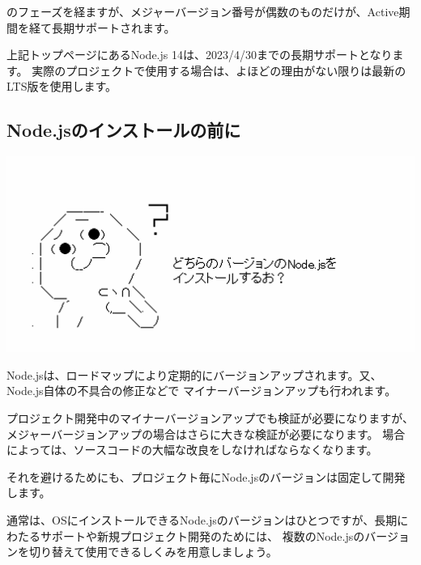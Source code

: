のフェーズを経ますが、メジャーバージョン番号が偶数のものだけが、Active期間を経て長期サポートされます。

\vspace*{\baselineskip}

上記トップページにあるNode.js 14は、2023/4/30までの長期サポートとなります。
実際のプロジェクトで使用する場合は、よほどの理由がない限りは最新のLTS版を使用します。

\subsection{Node.jsのインストールの前に}
\keeplastskip{
  \label{sec:1-1-2}
  \par\nobreak
}
\begin{reviewimage}%
\includegraphics[width=1.0\maxwidth]{./images/01-createDevEnv/y01_whichNodeVer.png}%
\label{image:01-createDevEnv:y01_whichNodeVer}
\end{reviewimage}

Node.jsは、ロードマップにより定期的にバージョンアップされます。又、Node.js自体の不具合の修正などで
マイナーバージョンアップも行われます。

\vspace*{\baselineskip}

プロジェクト開発中のマイナーバージョンアップでも検証が必要になりますが、
メジャーバージョンアップの場合はさらに大きな検証が必要になります。
場合によっては、ソースコードの大幅な改良をしなければならなくなります。

\vspace*{\baselineskip}

それを避けるためにも、プロジェクト毎にNode.jsのバージョンは固定して開発します。

\vspace*{\baselineskip}

通常は、OSにインストールできるNode.jsのバージョンはひとつですが、長期にわたるサポートや新規プロジェクト開発のためには、
複数のNode.jsのバージョンを切り替えて使用できるしくみを用意しましょう。

